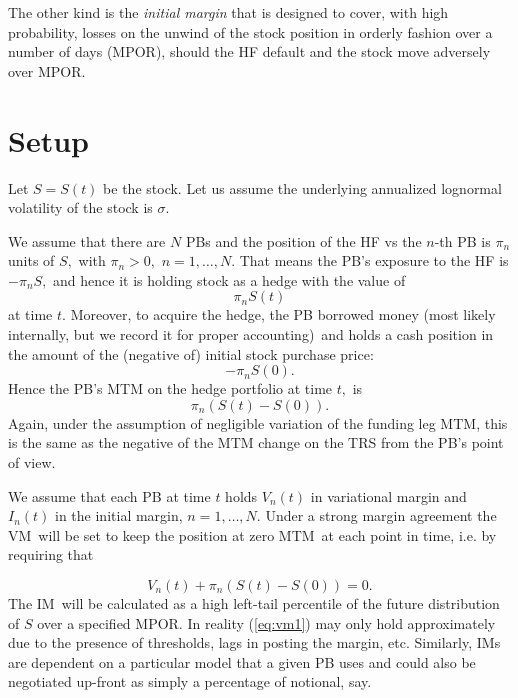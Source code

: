 \documentclass{article}
\begin{document}
The other kind is the \emph{initial margin} that is designed to cover, with
high probability, losses on the unwind of the stock position in orderly
fashion over a number of days (MPOR), should the HF default and the stock
move adversely over MPOR.

\section{Setup}

Let $S=S(t)$ be the stock. Let us assume the underlying annualized lognormal
volatility of the stock is $\sigma $. 

We assume that there are $N$ PBs and the position of the HF vs the $n$-th PB
is $\pi _{n}$ units of $S,$ with $\pi _{n}>0,$ $n=1,\dots ,N.$ That means
the PB's exposure to the HF is $-\pi _{n}S,$ and hence it is holding stock
as a hedge with the value of%
\begin{equation*}
\pi _{n}S(t)
\end{equation*}%
at time $t.$ Moreover, to acquire the hedge, the PB borrowed money (most
likely internally, but we record it for proper accounting)\ and holds a cash
position in the amount of the (negative of) initial stock purchase price:%
\begin{equation*}
-\pi _{n}S(0).
\end{equation*}%
Hence the PB's MTM on the hedge portfolio at time $t,$ is%
\begin{equation*}
\pi _{n}\left( S(t)-S(0)\right) .
\end{equation*}%
Again, under the assumption of negligible variation of the funding leg MTM,
this is the same as the negative of the MTM change on the TRS from the PB's
point of view.

We assume that each PB at time $t$ holds $V_{n}(t)$ in variational margin
and $I_{n}(t)$ in the initial margin, $n=1,\dots ,N.$ Under a strong margin
agreement the VM\ will be set to keep the position at zero MTM\ at each
point in time, i.e. by requiring that

\begin{equation}
V_{n}(t)+\pi _{n}\left( S(t)-S(0)\right) =0.  \label{eq:vm1}
\end{equation}%
The IM\ will be calculated as a high left-tail percentile of the future
distribution of $S$ over a specified MPOR. In reality (\ref{eq:vm1}) may
only hold approximately due to the presence of thresholds, lags in posting
the margin, etc. Similarly, IMs are dependent on a particular model that a
given PB uses and could also be negotiated up-front as simply a percentage
of notional, say. 
\end{document}
